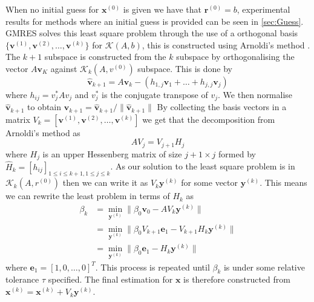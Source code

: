 When no initial guess for $\bm{x}^{(0)}$ is given we have that $\bm{r}^{(0)}=b$, experimental results for methods where an initial guess is provided can be seen in \cref{sec:Guess}. GMRES solves this least square problem through the use of a orthogonal basis $\{\bm{v}^{(1)},\bm{v}^{(2)},\dots,\bm{v}^{(k)}\}$ for $\mathcal{K}(A,b)$, this is constructed using Arnoldi's method \cite{Arnoldi1951TheProblem,Elman2005FiniteDynamics}. The $k+1$ subspace is constructed from the $k$ subspace by orthogonalising the vector $A\bm{v}_K$ against $\mathcal{K}_k(A,v^{(0)})$ subspace. This is done by
\begin{equation*}
    \bm{\hat{v}}_{k+1} = A\bm{v}_k - (h_{1,j}\bm{v}_1 + \dots + h_{j,j}\bm{v}_j)
\end{equation*}
where $h_{ij} = v_j^*Av_j$ and $v_j^*$ is the conjugate transpose of $v_j$. We then normalise $\bm{\hat{v}}_{k+1}$ to obtain $\bm{v}_{k+1}=\bm{\hat{v}}_{k+1}/\lVert \bm{\hat{v}}_{k+1} \rVert$
By collecting the basis vectors in a matrix $V_k = [\bm{v}^{(1)},\bm{v}^{(2)},\dots,\bm{v}^{(k)}]$ we get that the decomposition from Arnoldi's method as
\begin{equation*}
    AV_j = V_{j+1} H_j
\end{equation*}
 where $H_j$ is an upper Hessenberg matrix of size $j + 1\times j$ formed by $\hat{H}_k = [h_{ij}]_{1 \leq i \leq k+1, 1 \leq j \leq k}$. As our solution to the least square problem is in $\mathcal{K}_k(A,r^{(0)})$ then we can write it as $V_k\bm{y}^{(k)}$ for some vector $\bm{y}^{(k)}$. This means we can rewrite the least problem in terms of $H_k$ as
 \begin{equation*}
 \begin{aligned}
          \beta_k &= \min\limits_{\bm{y}^{(k)}} \lVert  \beta_0 \bm{v}_0 - AV_k\bm{y}^{(k)} \rVert \\
          &= \min\limits_{\bm{y}^{(k)}} \lVert \beta_0 V_{k+1} \bm{e}_1 - V_{k+1}H_k\bm{y}^{(k)} \rVert \\
          &= \min\limits_{\bm{y}^{(k)}} \lVert \beta_0 \bm{e}_1 - H_k\bm{y}^{(k)} \rVert
 \end{aligned}
 \end{equation*}
where $\bm{e}_1 = [1,0,\dots,0]^T$. This process is repeated until $\beta_k$ is under some relative tolerance $\tau$ specified. The final estimation for $\bm{x}$ is therefore constructed from $\bm{x}^{(k)} = \bm{x}^{(k)} + V_k\bm{y}^{(k)}$.
